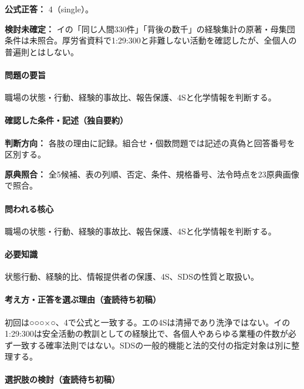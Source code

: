 \textbf{公式正答：} 4（single）。

\par\textbf{検討未確定：} イの「同じ人間330件」「背後の数千」の経験集計の原著・母集団条件は未照合。厚労省資料で1:29:300と非難しない活動を確認したが、全個人の普遍則とはしない。

\paragraph{問題の要旨} 職場の状態・行動、経験的事故比、報告保護、4Sと化学情報を判断する。

\paragraph{確認した条件・記述（独自要約）}\mbox{}\par

\noindent\textbf{判断方向：} 各肢の理由に記録。組合せ・個数問題では記述の真偽と回答番号を区別する。\par

\noindent\textbf{原典照合：} 全5候補、表の列順、否定、条件、規格番号、法令時点を23原典画像で照合。\par

\paragraph{問われる核心} 職場の状態・行動、経験的事故比、報告保護、4Sと化学情報を判断する。

\paragraph{必要知識} 状態行動、経験的比、情報提供者の保護、4S、SDSの性質と取扱い。

\paragraph{考え方・正答を選ぶ理由（査読待ち初稿）} 初回は○○○×○、4で公式と一致する。エの4Sは清掃であり洗浄ではない。イの1:29:300は安全活動の教訓としての経験比で、各個人やあらゆる業種の件数が必ず一致する確率法則ではない。SDSの一般的機能と法的交付の指定対象は別に整理する。

\paragraph{選択肢の検討（査読待ち初稿）}\mbox{}\par

